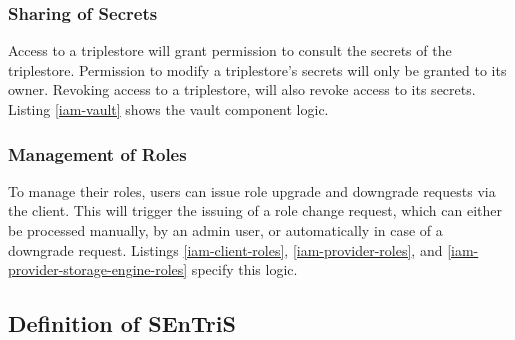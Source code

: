 %

%

%

\subsubsection{Sharing of Secrets} Access to a triplestore will grant permission to consult the secrets of the triplestore. Permission to modify a triplestore's secrets will only be granted to its owner. Revoking access to a triplestore, will also revoke access to its secrets. Listing \ref{iam-vault} shows the vault component logic.

%

%

\subsubsection{Management of Roles} To manage their roles, users can issue role upgrade and downgrade requests via the client. This will trigger the issuing of a role change request, which can either be processed manually, by an admin user, or automatically in case of a downgrade request. Listings \ref{iam-client-roles}, \ref{iam-provider-roles}, and \ref{iam-provider-storage-engine-roles} specify this logic.

%

%

%

\subsection{Definition of SEnTriS}
\label{ch4:sec:implementation:formal-definition}


